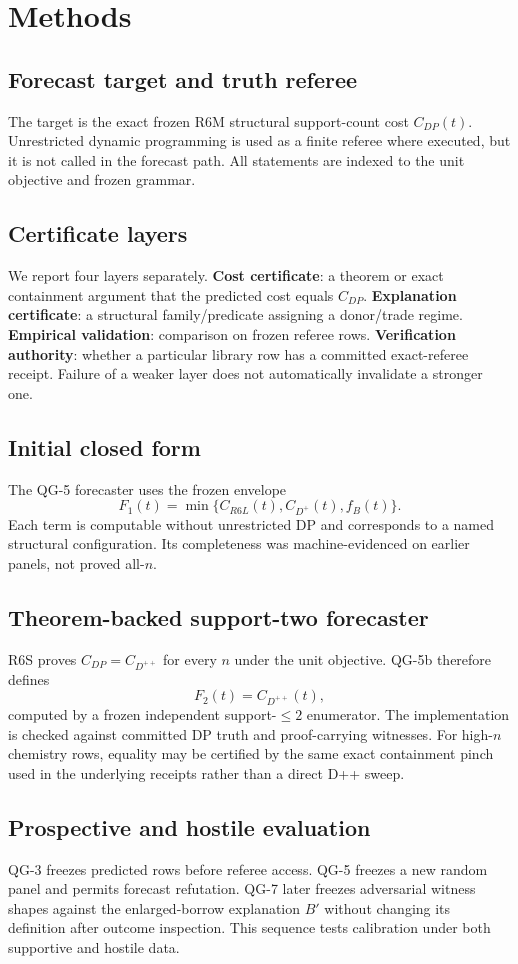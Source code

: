 \section{Methods}

\subsection{Forecast target and truth referee}
The target is the exact frozen R6M structural support-count cost $C_{DP}(t)$. Unrestricted dynamic programming is used as a finite referee where executed, but it is not called in the forecast path. All statements are indexed to the unit objective and frozen grammar.

\subsection{Certificate layers}
We report four layers separately. \textbf{Cost certificate}: a theorem or exact containment argument that the predicted cost equals $C_{DP}$. \textbf{Explanation certificate}: a structural family/predicate assigning a donor/trade regime. \textbf{Empirical validation}: comparison on frozen referee rows. \textbf{Verification authority}: whether a particular library row has a committed exact-referee receipt. Failure of a weaker layer does not automatically invalidate a stronger one.

\subsection{Initial closed form}
The QG-5 forecaster uses the frozen envelope
\[
F_1(t)=\min\{C_{R6L}(t),C_{D^+}(t),f_B(t)\}.
\]
Each term is computable without unrestricted DP and corresponds to a named structural configuration. Its completeness was machine-evidenced on earlier panels, not proved all-$n$.

\subsection{Theorem-backed support-two forecaster}
R6S proves $C_{DP}=C_{D^{++}}$ for every $n$ under the unit objective. QG-5b therefore defines
\[
F_2(t)=C_{D^{++}}(t),
\]
computed by a frozen independent support-$\le2$ enumerator. The implementation is checked against committed DP truth and proof-carrying witnesses. For high-$n$ chemistry rows, equality may be certified by the same exact containment pinch used in the underlying receipts rather than a direct D++ sweep.

\subsection{Prospective and hostile evaluation}
QG-3 freezes predicted rows before referee access. QG-5 freezes a new random panel and permits forecast refutation. QG-7 later freezes adversarial witness shapes against the enlarged-borrow explanation $B'$ without changing its definition after outcome inspection. This sequence tests calibration under both supportive and hostile data.